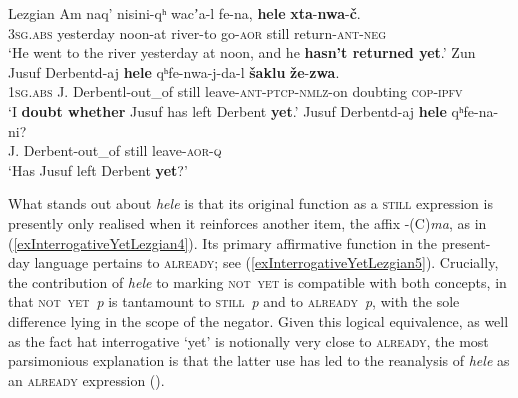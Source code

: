 \begin{exe}
	\ex 
	\begin{xlist}
		\exi{}Lezgian
		\ex \label{exInterrogativeYetLezgian1}
		\gll Am naq' nisini-qʰ wacʼa-l fe-na, \textbf{hele} \textbf{xta}-\textbf{nwa}-\textbf{č}.\\
		3\textsc{sg}.\textsc{abs} yesterday noon-at river-to go-\textsc{aor} still return-\textsc{ant}-\textsc{neg}\\
		\glt \lq He went to the river yesterday at noon, and he \textbf{hasn't returned yet}.\rq
			\ex \label{exInterrogativeYetLezgian2}
		\gll Zun Jusuf Derbentd-aj \textbf{hele} qʰfe-nwa-j-da-l \textbf{šaklu} \textbf{že}-\textbf{zwa}.\\
		1\textsc{sg}.\textsc{abs} J. Derbentl-out\_of still leave-\textsc{ant}-\textsc{ptcp}-\textsc{nmlz}-on doubting \textsc{cop}-\textsc{ipfv}\\
		\glt \lq I \textbf{doubt whether} Jusuf has left Derbent \textbf{yet}.\rq
		\ex \label{exInterrogativeYetLezgian3}
		\gll Jusuf Derbentd-aj \textbf{hele} qʰfe-na-ni?\\
		J. Derbent-out\_of still leave-\textsc{aor}-\textsc{q}\\
		\glt \lq Has Jusuf left Derbent \textbf{yet}?' \parencite[84, 88]{Haspelmath1991}
	\end{xlist}
\end{exe}

What stands out about \textit{hele} is that its original function as a \textsc{still} expression is presently only realised when it reinforces another item, the affix \mbox{-(C)\textit{ma}}, as in (\ref{exInterrogativeYetLezgian4}). Its primary affirmative function in the present-day language pertains to \textsc{already}; see (\ref{exInterrogativeYetLezgian5}). Crucially, the contribution of \textit{hele} to marking \mbox{\textsc{not yet}} is compatible with both concepts, in that \mbox{\textsc{not yet} \textit{p}} is tantamount to \mbox{\textsc{still} \neg\textit{p}} and to \mbox{\neg\textsc{already} \textit{p}}, with the sole difference lying in the scope of the negator. Given this logical equivalence, as well as the fact hat interrogative \lq yet\rq{ }is notionally very close to \textsc{already}, the most parsimonious explanation is that the latter use has led to the reanalysis of \textit{hele} as an \textsc{already} expression (\cite{vanderAuwera1998}).

